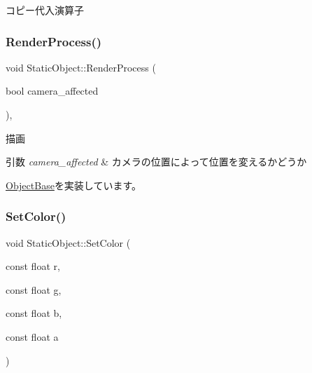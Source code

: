 コピー代入演算子 

\mbox{\label{class_static_object_afec57009537695c4715386120a619942}} 
\subsubsection{\texorpdfstring{Render\+Process()}{RenderProcess()}}
{\footnotesize\ttfamily void Static\+Object\+::\+Render\+Process (\begin{DoxyParamCaption}\item[{bool}]{camera\+\_\+affected }\end{DoxyParamCaption})\hspace{0.3cm}{\ttfamily [protected]}, {\ttfamily [virtual]}}



描画 


\begin{DoxyParams}{引数}
{\em camera\+\_\+affected} & カメラの位置によって位置を変えるかどうか \\
\hline
\end{DoxyParams}


\mbox{\hyperlink{class_object_base_aeac51d868beeb7f7fe900407b76b93a2}{Object\+Base}}を実装しています。

\mbox{\label{class_static_object_a44408a8130d19f7284fe4daaab87c712}} 
\subsubsection{\texorpdfstring{Set\+Color()}{SetColor()}}
{\footnotesize\ttfamily void Static\+Object\+::\+Set\+Color (\begin{DoxyParamCaption}\item[{const float}]{r,  }\item[{const float}]{g,  }\item[{const float}]{b,  }\item[{const float}]{a }\end{DoxyParamCaption})}

\mbox{\label{class_static_object_a7fa678c3c4032bb6e9417f93a8bb895c}} 
